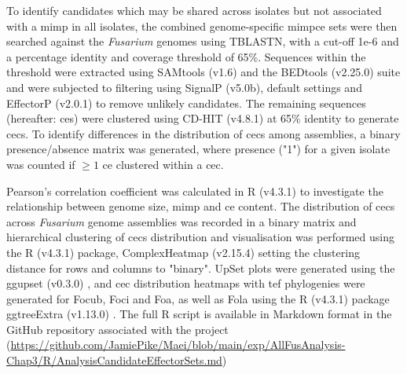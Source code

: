 To identify candidates which may be shared across isolates but not associated with a \ac{mimp} in all isolates, the combined genome-specific \ac{mimpce} sets were then searched against the \textit{Fusarium} genomes using TBLASTN, with a cut-off 1e-6 and a percentage identity and coverage threshold of 65\%. Sequences within the threshold were extracted using SAMtools (v1.6) and the BEDtools (v2.25.0) suite and were subjected to filtering using SignalP (v5.0b), default settings and EffectorP (v2.0.1) to remove unlikely candidates. The remaining sequences (hereafter: \acfp{ce}) were clustered using CD-HIT (v4.8.1) \parencite{Fu2012} at 65\% identity to generate \acp{cec}. To identify differences in the distribution of \acp{cec} among assemblies, a binary presence/absence matrix was generated, where presence ("1") for a given isolate was counted if $\geq1 $ \ac{ce} clustered within a \ac{cec}.

Pearson’s correlation coefficient was calculated in R (v4.3.1) \parencite{R} to investigate the relationship between genome size, \ac{mimp} and \ac{ce} content. The distribution of \acp{cec} across \textit{Fusarium} genome assemblies was recorded in a binary matrix and hierarchical clustering of \acp{cec} distribution and visualisation was performed using the R (v4.3.1) \parencite{R} package, ComplexHeatmap (v2.15.4)  \parencite{ComplexHeatmap} setting the clustering distance for rows and columns to "binary". UpSet plots were generated using the ggupset (v0.3.0) \parencite{ggupset}, and \ac{cec} distribution heatmaps with \ac{tef} phylogenies were generated for \ac{Focub}, \ac{Foci} and \ac{Foa}, as well as \ac{Fola} using the R (v4.3.1) package ggtreeExtra (v1.13.0) \parencite{ggtree}. The full R script is available in Markdown format in the GitHub repository associated with the project (\href{https://github.com/JamiePike/Maei/blob/main/exp/AllFusAnalysis-Chap3/R/AnalysisCandidateEffectorSets.md}{https://github.com/JamiePike/Maei/blob/mai\-n/exp/AllFusAnalysis-Chap3/R/AnalysisCandidateEffectorSets.md}) 

